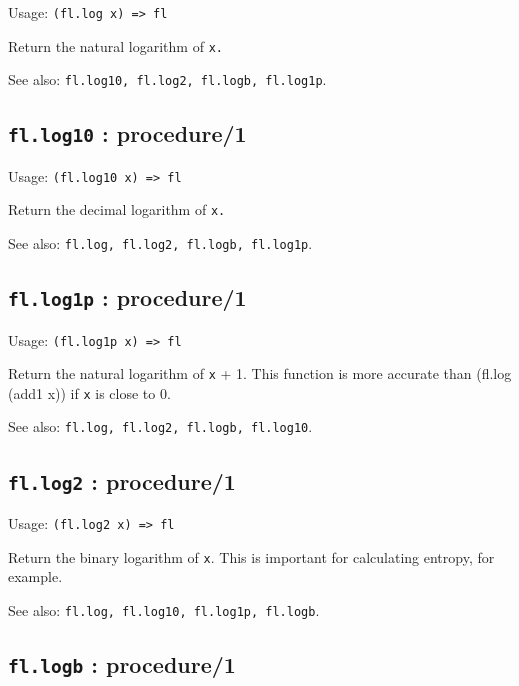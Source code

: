 \documentclass[
]{article}
\newcommand{\passthrough}[1]{#1}
\begin{document}
Usage: \passthrough{\lstinline!(fl.log x) => fl!}

Return the natural logarithm of \passthrough{\lstinline!x.!}

See also:
\passthrough{\lstinline!fl.log10, fl.log2, fl.logb, fl.log1p!}.

\hypertarget{fl.log10-procedure1-1}{%
\subsection{\texorpdfstring{\texttt{fl.log10} :
procedure/1}{fl.log10 : procedure/1}}\label{fl.log10-procedure1-1}}

Usage: \passthrough{\lstinline!(fl.log10 x) => fl!}

Return the decimal logarithm of \passthrough{\lstinline!x.!}

See also: \passthrough{\lstinline!fl.log, fl.log2, fl.logb, fl.log1p!}.

\hypertarget{fl.log1p-procedure1-1}{%
\subsection{\texorpdfstring{\texttt{fl.log1p} :
procedure/1}{fl.log1p : procedure/1}}\label{fl.log1p-procedure1-1}}

Usage: \passthrough{\lstinline!(fl.log1p x) => fl!}

Return the natural logarithm of \passthrough{\lstinline!x!} + 1. This
function is more accurate than (fl.log (add1 x)) if
\passthrough{\lstinline!x!} is close to 0.

See also: \passthrough{\lstinline!fl.log, fl.log2, fl.logb, fl.log10!}.

\hypertarget{fl.log2-procedure1-1}{%
\subsection{\texorpdfstring{\texttt{fl.log2} :
procedure/1}{fl.log2 : procedure/1}}\label{fl.log2-procedure1-1}}

Usage: \passthrough{\lstinline!(fl.log2 x) => fl!}

Return the binary logarithm of \passthrough{\lstinline!x!}. This is
important for calculating entropy, for example.

See also: \passthrough{\lstinline!fl.log, fl.log10, fl.log1p, fl.logb!}.

\hypertarget{fl.logb-procedure1-1}{%
\subsection{\texorpdfstring{\texttt{fl.logb} :
procedure/1}{fl.logb : procedure/1}}\label{fl.logb-procedure1-1}}
\end{document}
